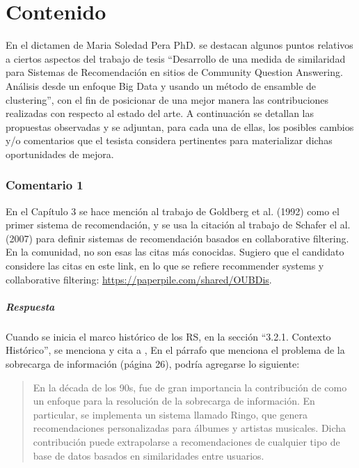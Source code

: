 \chapter*{Contenido}\label{ch:contenido}
En el dictamen de Maria Soledad Pera PhD. se destacan algunos puntos relativos a ciertos aspectos del trabajo de tesis ``Desarrollo de una medida de similaridad para Sistemas de Recomendación en sitios de Community Question Answering. Análisis desde un enfoque Big Data y usando un método de ensamble de clustering'', con el fin de posicionar de una mejor manera las contribuciones realizadas con respecto al estado del arte. A continuación se detallan las propuestas observadas y se adjuntan, para cada una de ellas, los posibles cambios y/o comentarios que el tesista considera pertinentes para materializar dichas oportunidades de mejora.

\subsection*{Comentario 1}
En el Capítulo 3 se hace mención al trabajo de Goldberg et al. (1992) como el primer sistema de recomendación, y se usa la citación al trabajo de Schafer el al. (2007) para definir sistemas de recomendación basados en collaborative filtering. En la comunidad, no son esas las citas más conocidas. Sugiero que el candidato considere las citas en este link, en lo que se refiere recommender systems y collaborative filtering: \url{https://paperpile.com/shared/OUBDis}.

\paragraph*{Respuesta}
Cuando se inicia el marco histórico de los RS, en la sección ``3.2.1. Contexto Histórico'', se menciona y cita a \citep{goldberg1992using}, En el párrafo que menciona el problema de la sobrecarga de información (página 26), podría agregarse lo siguiente:

\begin{quotation}
En la década de los 90s, fue de gran importancia la contribución de \citep{shardanand1995social} como un enfoque para la resolución de la sobrecarga de información. En particular, se implementa un sistema llamado Ringo, que genera recomendaciones personalizadas para álbumes y artistas musicales. Dicha contribución puede extrapolarse a recomendaciones de cualquier tipo de base de datos basados en similaridades entre usuarios.
\end{quotation}

